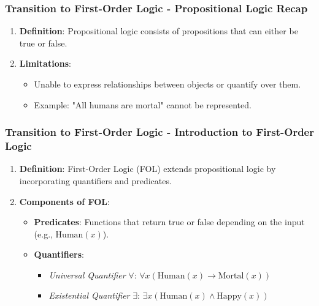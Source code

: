 \documentclass[aspectratio=169]{beamer}
\begin{document}
\begin{frame}[fragile]
    \frametitle{Transition to First-Order Logic - Propositional Logic Recap}
    \begin{enumerate}
        \item \textbf{Definition}: Propositional logic consists of propositions that can either be true or false.
        \item \textbf{Limitations}:
        \begin{itemize}
            \item Unable to express relationships between objects or quantify over them.
            \item Example: "All humans are mortal" cannot be represented.
        \end{itemize}
    \end{enumerate}
\end{frame}

\begin{frame}[fragile]
    \frametitle{Transition to First-Order Logic - Introduction to First-Order Logic}
    \begin{enumerate}
        \item \textbf{Definition}: First-Order Logic (FOL) extends propositional logic by incorporating quantifiers and predicates.
        
        \item \textbf{Components of FOL}:
        \begin{itemize}
            \item \textbf{Predicates}: Functions that return true or false depending on the input (e.g., $ \text{Human}(x) $).
            \item \textbf{Quantifiers}:
            \begin{itemize}
                \item \textit{Universal Quantifier} $ \forall $: \( \forall x (\text{Human}(x) \rightarrow \text{Mortal}(x)) \)
                \item \textit{Existential Quantifier} $ \exists $: \( \exists x (\text{Human}(x) \land \text{Happy}(x)) \)
            \end{itemize}
        \end{itemize}
    \end{enumerate}
\end{frame}
\end{document}
